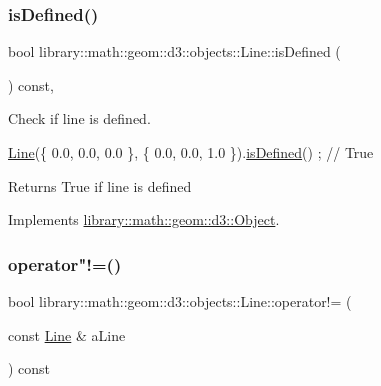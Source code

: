 \subsubsection{\texorpdfstring{is\+Defined()}{isDefined()}}
{\footnotesize\ttfamily bool library\+::math\+::geom\+::d3\+::objects\+::\+Line\+::is\+Defined (\begin{DoxyParamCaption}{ }\end{DoxyParamCaption}) const\hspace{0.3cm}{\ttfamily [override]}, {\ttfamily [virtual]}}



Check if line is defined. 


\begin{DoxyCode}
\hyperlink{classlibrary_1_1math_1_1geom_1_1d3_1_1objects_1_1_line_a762e529453ff9ffa9233fd73737f4692}{Line}(\{ 0.0, 0.0, 0.0 \}, \{ 0.0, 0.0, 1.0 \}).\hyperlink{classlibrary_1_1math_1_1geom_1_1d3_1_1objects_1_1_line_ab7b509259a32ac21c83bb14fcc7f83f3}{isDefined}() ; \textcolor{comment}{// True}
\end{DoxyCode}


\begin{DoxyReturn}{Returns}
True if line is defined 
\end{DoxyReturn}


Implements \hyperlink{classlibrary_1_1math_1_1geom_1_1d3_1_1_object_a2216442e322f0c3ca5f01a4efa22baf7}{library\+::math\+::geom\+::d3\+::\+Object}.

\mbox{\label{classlibrary_1_1math_1_1geom_1_1d3_1_1objects_1_1_line_ae49d3224ab2f209f192bb3b1e152766e}} 
\subsubsection{\texorpdfstring{operator"!=()}{operator!=()}}
{\footnotesize\ttfamily bool library\+::math\+::geom\+::d3\+::objects\+::\+Line\+::operator!= (\begin{DoxyParamCaption}\item[{const \hyperlink{classlibrary_1_1math_1_1geom_1_1d3_1_1objects_1_1_line}{Line} \&}]{a\+Line }\end{DoxyParamCaption}) const}



